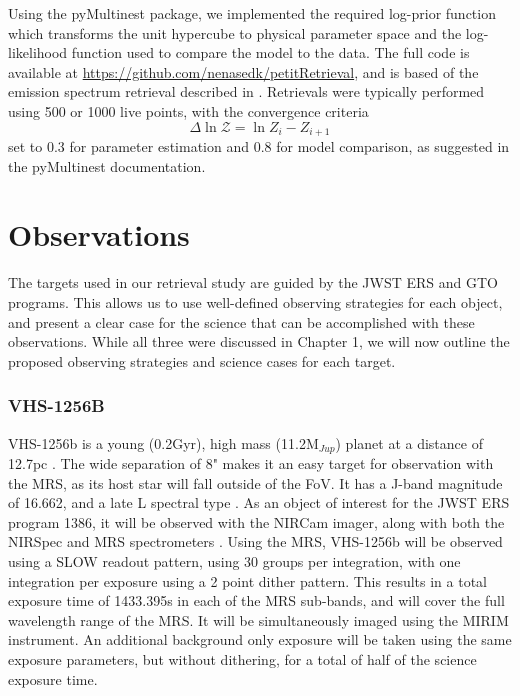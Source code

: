 Using the pyMultinest package, we implemented the required log-prior function which transforms the unit hypercube to physical parameter space and the log-likelihood function used to compare the model to the data. The full code is available at \url{https://github.com/nenasedk/petitRetrieval}, and is based of the emission spectrum retrieval described in \parencite{Molliere2019}. 
Retrievals were typically performed using 500 or 1000 live points, with the convergence criteria 
\begin{equation}
\Delta\ln\mathcal{Z} = \ln{Z_{i} - Z_{i+1}}
\end{equation}
set to 0.3 for parameter estimation and 0.8 for model comparison, as suggested in the pyMultinest documentation.

\section{Observations}\label{sec:obs}
The targets used in our retrieval study are guided by the JWST ERS and GTO programs. This allows us to use well-defined observing strategies for each object, and present a clear case for the science that can be accomplished with these observations.
While all three were discussed in Chapter 1, we will now outline the proposed observing strategies and science cases for each target.
\subsubsection{VHS-1256B}
VHS-1256b is a young (0.2Gyr), high mass (11.2M$_{Jup}$) planet at a distance of 12.7pc \parencite{Bowler2016}. 
The wide separation of 8" makes it an easy target for observation with the MRS, as its host star will fall outside of the FoV.
It has a J-band magnitude of 16.662, and a late L spectral type \parencite{Miles2018}.
As an object of interest for the JWST ERS program 1386, it will be observed with the NIRCam imager, along with both the NIRSpec and MRS spectrometers \parencite{Hinkley2019}.
Using the MRS, VHS-1256b will be observed using a SLOW readout pattern, using 30 groups per integration, with one integration per exposure using a 2 point dither pattern.
This results in a total exposure time of 1433.395s in each of the MRS sub-bands, and will cover the full wavelength range of the MRS.
It will be simultaneously imaged using the MIRIM instrument.
An additional background only exposure will be taken using the same exposure parameters, but without dithering, for a total of half of the science exposure time.


